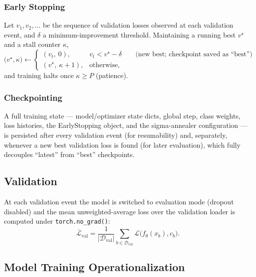 \documentclass[stu,floatsintext]{apa7}
\begin{document}
\subsubsection{Early Stopping}
Let $v_1,v_2,\dots$ be the sequence of validation losses observed at each validation event, and $\delta$ a minimum-improvement threshold. Maintaining a running best $v^\star$ and a stall
counter $\kappa$,
\begin{equation}
  \bigl(v^\star,\kappa\bigr) \leftarrow
  \begin{cases}
    (v_t,\ 0), & v_t < v^\star - \delta \qquad \text{(new best; checkpoint saved as ``best'')} \\
    (v^\star,\ \kappa+1), & \text{otherwise},
  \end{cases}
\end{equation}
and training halts once $\kappa \ge P$ (patience).

\subsubsection{Checkpointing}
A full training state — model/optimizer state dicts, global step, class weights, loss histories, the
EarlyStopping object, and the sigma-annealer configuration — is persisted after every validation
event (for resumability) and, separately, whenever a new best validation loss is found (for later
evaluation), which fully decouples ``latest'' from ``best'' checkpoints.

\subsection{Validation}

At each validation event the model is switched to evaluation mode (dropout disabled) and the mean
unweighted-average loss over the validation loader is computed under \texttt{torch.no\_grad()}:
\begin{equation}
  \bar{\mathcal L}_{\mathrm{val}} = \frac{1}{|\mathcal D_{\mathrm{val}}|}\sum_{b\in\mathcal D_{\mathrm{val}}}
  \mathcal L\bigl(f_\theta(x_b), c_b\bigr).
\end{equation}

\subsection{Model Training Operationalization}
\end{document}
